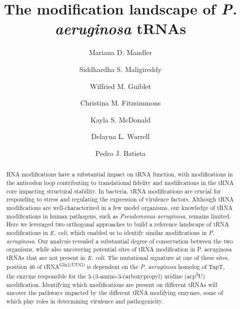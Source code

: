 \documentclass[times, twoside]{zHenriquesLab-StyleBioRxiv}
\begin{document}
\title{The modification landscape of \textit{P. aeruginosa} tRNAs }

\author[1]{Mariana D. Mandler}
\author[1]{Siddhardha S. Maligireddy}
\author[1]{Wilfried M. Guiblet}
\author[1]{Christina M. Fitzsimmons}
\author[1]{Kayla S. McDonald}
\author[2]{Delayna L. Warrell}
\author[1,\Letter]{Pedro J. Batista }


\maketitle

\begin{abstract}
RNA modifications have a substantial impact on tRNA function, with modifications in the anticodon loop contributing to translational fidelity and modifications in the tRNA core impacting structural stability. In bacteria, tRNA modifications are crucial for responding to stress and regulating the expression of virulence factors. Although tRNA modifications are well-characterized in a few model organisms, our knowledge of tRNA modifications in human pathogens, such as \textit{Pseudomonas aeruginosa}, remains limited. Here we leveraged two orthogonal approaches to build a reference landscape of tRNA modifications in \textit{E. coli}, which enabled us to identify similar modifications in \textit{P. aeruginosa}. Our analysis revealed a substantial degree of conservation between the two organisms, while also uncovering potential sites of tRNA modification in P. aeruginosa tRNAs that are not present in \textit{E. coli}. The mutational signature at one of these sites, position 46 of tRNA\textsuperscript{Gln1(UUG)} is dependent on the \textit{P. aeruginosa} homolog of TapT, the enzyme responsible for the 3-(3-amino-3-carboxypropyl) uridine (acp\textsuperscript{3}U) modification. Identifying which modifications are present on different tRNAs will uncover the pathways impacted by the different tRNA modifying enzymes, some of which play roles in determining virulence and pathogenicity. 
\end {abstract}
\end{document}
